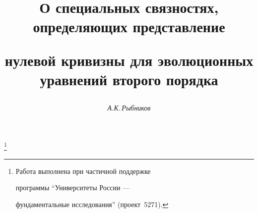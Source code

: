 

 


%  


 


\newcommand{\up}[2]{\overset{#1}{#2}{}} 


\newcommand{\Mod}{\operatorname{mod}} 


\newcommand{\vraisup}{\operatornamewithlimits{vrai~sup}} 


\newcommand{\tts}[1]{} 


 




 


\setcounter{page}{32} 












 


\author{\it А.К.\,Рыбников} 




\title{О специальных связностях, определяющих представление 


нулевой кривизны для эволюционных уравнений второго порядка} 


\thanks{Работа выполнена при частичной поддержке


программы ``Университеты России --- 


фундаментальные исследования'' (проект \No\,5271).} 


 


\date{} 




